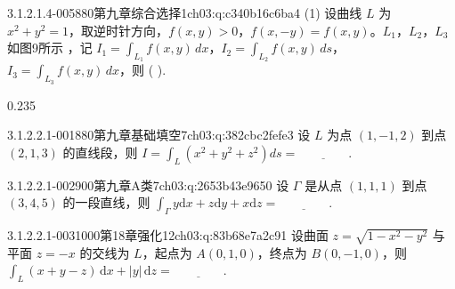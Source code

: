 \par\addvspace{\qsep}\noindent
\begin{minipage}{\linewidth}
\begin{q}{3.1.2.1.4-005}{880第九章综合选择1}{ch03:q:c340b16c6ba4}
(1) 设曲线 $L$ 为 $x^2+y^2=1$，取逆时针方向，$f(x,y)>0$，$f(x,-y)=f(x,y)$。$L_1$，$L_2$，$L_3$ 如图9所示 \text{[见图]}，记 $\displaystyle I_1=\int_{L_1}f(x,y)\,dx$，$\displaystyle I_2=\int_{L_2}f(x,y)\,ds$，$\displaystyle I_3=\int_{L_3}f(x,y)\,dx$，则 ( ).
\begin{opts}{0.235}
\hfill{}\hfill{}\hfill{}
\end{opts}
\begin{figblock}
\end{figblock}
\end{q}
\end{minipage}


\par\addvspace{2.4ex}\noindent
\begin{minipage}{\linewidth}


\begin{q}{3.1.2.2.1-001}{880第九章基础填空7}{ch03:q:382cbc2fefe3}
设 $L$ 为点 $(1,-1,2)$ 到点 $(2,1,3)$ 的直线段，则 $\displaystyle I=\int_L (x^2+y^2+z^2)ds=\underline{\hspace{4em}}$.
\end{q}
\end{minipage}


\begin{q}{3.1.2.2.1-002}{900第九章A类7}{ch03:q:2653b43e9650}
设 $\Gamma$ 是从点 $(1,1,1)$ 到点 $(3,4,5)$ 的一段直线，则 $\displaystyle \int_{\Gamma} y\mathrm{d}x+z\mathrm{d}y+x\mathrm{d}z = \underline{\hspace{4em}}$.
\end{q}

\begin{q}{3.1.2.2.1-003}{1000第18章强化12}{ch03:q:83b68e7a2c91}
设曲面 $z=\sqrt{1-x^2-y^2}$ 与平面 $z=-x$ 的交线为 $L$，起点为 $A(0,1,0)$，终点为 $B(0,-1,0)$，则
$\displaystyle \int_L (x+y-z)\,\mathrm{d}x+|y|\,\mathrm{d}z=\underline{\hspace{4em}}.$
\end{q}


